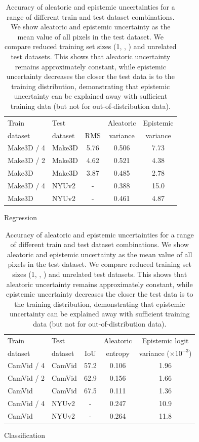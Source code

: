 \begin{table}[t]
\centering
    \begin{subtable}[t]{\linewidth}
        \centering
          \begin{tabular}{l|l|c|c|c}
    \toprule
          Train & Test & & Aleatoric & Epistemic  \\
          dataset & dataset & RMS & variance & variance  \\ 
          \midrule
          Make3D / 4 & Make3D & 5.76 & 0.506 & 7.73 \\
          Make3D / 2 & Make3D & 4.62 & 0.521 & 4.38 \\
          Make3D & Make3D & 3.87 & 0.485 & 2.78\\
          \midrule
          Make3D / 4 & NYUv2 & - & 0.388 & 15.0 \\
          Make3D & NYUv2 & - & 0.461 & 4.87 \\
    \bottomrule
          \end{tabular}
        \caption{Regression}
    \end{subtable}%
    
    
    \begin{subtable}[t]{\linewidth}
        \centering
          \begin{tabular}{l|l|c|c|c}
    \toprule
          Train & Test & & Aleatoric & Epistemic logit \\
          dataset & dataset & IoU & entropy & variance ($\times10^{-3}$)  \\ 
    \midrule
          CamVid / 4 & CamVid & 57.2 & 0.106 & 1.96 \\
          CamVid / 2 & CamVid & 62.9 & 0.156 & 1.66 \\
          CamVid & CamVid & 67.5 & 0.111 & 1.36 \\
    \midrule
          CamVid / 4 & NYUv2 & - & 0.247 & 10.9 \\
          CamVid & NYUv2 & - & 0.264 & 11.8 \\
    \bottomrule
          \end{tabular}
        \caption{Classification}
    \end{subtable}
\caption[Accuracy of aleatoric and epistemic uncertainties.]{Accuracy of aleatoric and epistemic uncertainties for a range of different train and test dataset combinations. We show aleatoric and epistemic uncertainty as the mean value of all pixels in the test dataset. We compare reduced training set sizes (1, , ) and unrelated test datasets. This shows that aleatoric uncertainty remains approximately constant, while epistemic uncertainty decreases the closer the test data is to the training distribution, demonstrating that epistemic uncertainty can be explained away with sufficient training data (but not for out-of-distribution data).}
\label{datasetsize}
\end{table}


